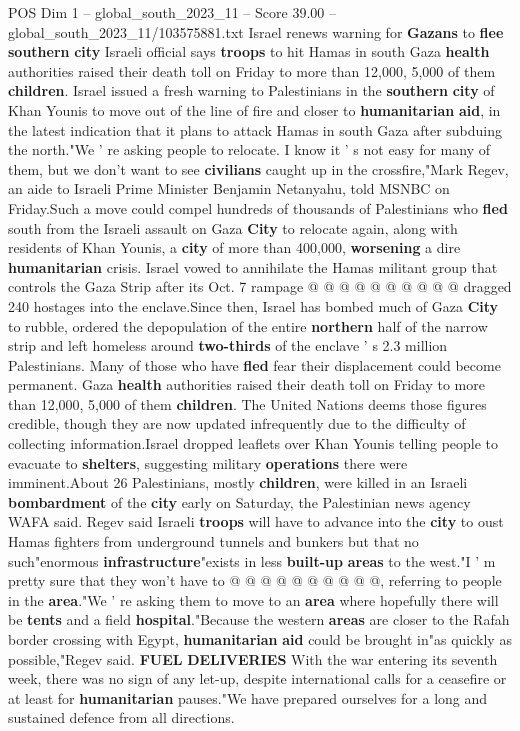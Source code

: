 \begin{textsample}{POS Dim 1 – global\_south\_2023\_11 – Score 39.00 – global\_south\_2023\_11/103575881.txt}  \label{ex:f1_pos_121}
Israel renews warning for \textbf{Gazans} to \textbf{flee} \textbf{southern} \textbf{city} Israeli official says \textbf{troops} to hit Hamas in south Gaza \textbf{health} authorities raised their death toll on Friday to more than 12,000, 5,000 of them \textbf{children}.
Israel issued a fresh warning to Palestinians in the \textbf{southern} \textbf{city} of Khan Younis to move out of the line of fire and closer to \textbf{humanitarian} \textbf{aid}, in the latest indication that it plans to attack Hamas in south Gaza after subduing the north."We ' re asking people to relocate.
I know it ' s not easy for many of them, but we don't want to see \textbf{civilians} caught up in the crossfire,"Mark Regev, an aide to Israeli Prime Minister Benjamin Netanyahu, told MSNBC on Friday.Such a move could compel hundreds of thousands of Palestinians who \textbf{fled} south from the Israeli assault on Gaza \textbf{City} to relocate again, along with residents of Khan Younis, a \textbf{city} of more than 400,000, \textbf{worsening} a dire \textbf{humanitarian} crisis.
Israel vowed to annihilate the Hamas militant group that controls the Gaza Strip after its Oct. 7 rampage @ @ @ @ @ @ @ @ @ @ dragged 240 hostages into the enclave.Since then, Israel has bombed much of Gaza \textbf{City} to rubble, ordered the depopulation of the entire \textbf{northern} half of the narrow strip and left homeless around \textbf{two-thirds} of the enclave ' s 2.3 million Palestinians.
Many of those who have \textbf{fled} fear their displacement could become permanent.
Gaza \textbf{health} authorities raised their death toll on Friday to more than 12,000, 5,000 of them \textbf{children}.
The United Nations deems those figures credible, though they are now updated infrequently due to the difficulty of collecting information.Israel dropped leaflets over Khan Younis telling people to evacuate to \textbf{shelters}, suggesting military \textbf{operations} there were imminent.About 26 Palestinians, mostly \textbf{children}, were killed in an Israeli \textbf{bombardment} of the \textbf{city} early on Saturday, the Palestinian news agency WAFA said.
Regev said Israeli \textbf{troops} will have to advance into the \textbf{city} to oust Hamas fighters from underground tunnels and bunkers but that no such"enormous \textbf{infrastructure}"exists in less \textbf{built-up} \textbf{areas} to the west."I ' m pretty sure that they won't have to @ @ @ @ @ @ @ @ @ @, referring to people in the \textbf{area}."We ' re asking them to move to an \textbf{area} where hopefully there will be \textbf{tents} and a field \textbf{hospital}."Because the western \textbf{areas} are closer to the Rafah border crossing with Egypt, \textbf{humanitarian} \textbf{aid} could be brought in"as quickly as possible,"Regev said. \textbf{FUEL} \textbf{DELIVERIES} With the war entering its seventh week, there was no sign of any let-up, despite international calls for a ceasefire or at least for \textbf{humanitarian} pauses."We have prepared ourselves for a long and sustained defence from all directions.

\end{textsample}
